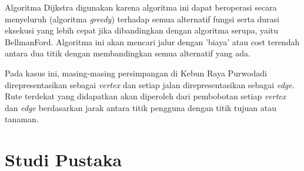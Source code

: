 \documentclass[conference]{IEEEtran}
\begin{document}
	Algoritma Dijkstra digunakan karena algoritma ini dapat beroperasi secara menyeluruh (algoritma \textit{greedy}) terhadap semua alternatif fungsi serta durasi eksekusi yang lebih cepat jika dibandingkan dengan algoritma serupa, yaitu BellmanFord. Algoritma ini akan mencari jalur dengan ’biaya’ atau cost terendah antara dua titik dengan membandingkan semua alternatif yang ada.

	Pada kasus ini, masing-masing persimpangan di Kebun Raya Purwodadi direpresentasikan sebagai \textit{vertex} dan setiap jalan direpresentasikan sebagai \textit{edge}. Rute terdekat yang didapatkan akan diperoleh dari pembobotan setiap \textit{vertex} dan \textit{edge} berdasarkan jarak antara titik pengguna dengan titik tujuan atau tanaman.
	\section{Studi Pustaka}
\end{document}
